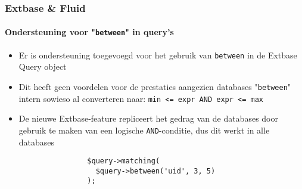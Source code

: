 
\begin{frame}[fragile]
	\frametitle{Extbase \& Fluid}
	\framesubtitle{Ondersteuning voor "\texttt{between}" in query's}

	\begin{itemize}

		\item Er is ondersteuning toegevoegd voor het gebruik van \texttt{between} 
			in de Extbase Query object

		\item Dit heeft geen voordelen voor de prestaties aangezien databases
			"\texttt{between}" intern sowieso al converteren naar:\newline
			\texttt{min <= expr AND expr <= max}

		\item De nieuwe Extbase-feature repliceert het gedrag van de databases door gebruik te 
			maken van een logische \texttt{AND}-conditie, dus dit werkt in alle databases

			\begin{lstlisting}
				$query->matching(
				  $query->between('uid', 3, 5)
				);
			\end{lstlisting}

	\end{itemize}

\end{frame}


